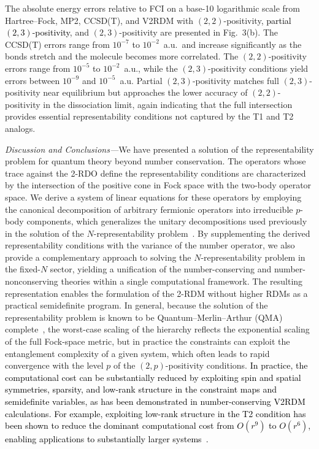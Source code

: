 \documentclass[aps,prl,floatfix,twocolumn,showpacs,10pt]{revtex4-2}
\begin{document}
The absolute energy errors relative to FCI on a base-10 logarithmic scale from Hartree–Fock, MP2, CCSD(T), and V2RDM with $(2,2)$-positivity, \textcolor{black}{partial $(2,3)$-positivity}, and $(2,3)$-positivity are presented in Fig.~3(b). The CCSD(T) errors range from $10^{-7}$ to $10^{-2}$~a.u.\ and increase significantly as the bonds stretch and the molecule becomes more correlated.  The $(2,2)$-positivity errors range from $10^{-5}$ to $10^{-2}$~a.u., while the $(2,3)$-positivity conditions yield errors between $10^{-9}$ and $10^{-5}$~a.u.  Partial $(2,3)$-positivity matches full $(2,3)$-positivity near equilibrium but approaches the lower accuracy of $(2,2)$-positivity in the dissociation limit, again indicating that the full intersection provides essential representability conditions not captured by the T1 and T2 analogs.

{\em Discussion and Conclusions---}We have presented a solution of the representability problem for quantum theory beyond number conservation.  The operators whose trace against the 2-RDO define the representability conditions are characterized by the intersection of the positive cone in Fock space with the two-body operator space. We derive a system of linear equations for these operators by employing the canonical decomposition of arbitrary fermionic operators into irreducible $p$-body components, which generalizes the unitary decompositions used previously in the solution of the $N$-representability problem~\cite{Mazziotti.2023}. By supplementing the derived representability conditions with the variance of the number operator, we also provide a complementary approach to solving the $N$-representability problem in the fixed-$N$ sector, yielding a unification of the number-conserving and number-nonconserving theories within a single computational framework. The resulting representation enables the formulation of the 2-RDM without higher RDMs as a practical semidefinite program. In general, because the solution of the representability problem is known to be Quantum--Merlin--Arthur (QMA) complete~\cite{Liu2007}, the worst-case scaling of the hierarchy reflects the exponential scaling of the full Fock-space metric, but in practice the constraints can exploit the entanglement complexity of a given system, which often leads to rapid convergence with the level $p$ of the $(2,p)$-positivity conditions.  \textcolor{black}{In practice, the computational cost can be substantially reduced by exploiting spin and spatial symmetries, sparsity, and low-rank structure in the constraint maps and semidefinite variables, as has been demonstrated in number-conserving V2RDM calculations.  For example, exploiting low-rank structure in the T2 condition has been shown to reduce the dominant computational cost from $O(r^{9})$ to $O(r^{6})$, enabling applications to substantially larger systems~\cite{Mazziotti2016, Mazziotti2020}.}
\end{document}

